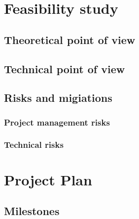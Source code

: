 \documentclass[notitlepage]{article}
\begin{document}
\begin{flushleft}
\section{Feasibility study}

\subsection{Theoretical point of view}

\subsection{Technical point of view}

\subsection{Risks and migiations}

\subsubsection{Project management risks}

\subsubsection{Technical risks}

\section{Project Plan}

\subsection{Milestones}


\end{flushleft}
\end{document}
